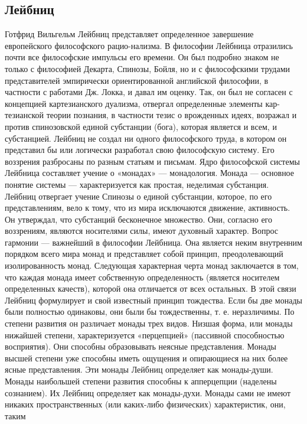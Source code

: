 \documentclass[12pt]{article}
\begin{document}
\subsection{Лейбниц}
Готфрид  Вильгельм  Лейбниц  представляет  определенное  завершение  европейского  философского  рацио-нализма. В философии Лейбница отразились почти все философские импульсы его времени. Он был подробно
знаком  не только с  философией Декарта,  Спинозы,  Бойля, но  и с  философскими трудами представителей
эмпирически ориентированной английской философии, в частности с работами Дж. Локка, и давал им оценку.
Так,  он  был  не  согласен  с  концепцией  картезианского  дуализма,  отвергал  определенные  элементы  кар-тезианской теории познания, в частности тезис о врожденных идеях, возражал и против спинозовской единой
субстанции (бога), которая является и всем, и субстанцией.
Лейбниц не создал ни одного философского труда, в котором он представил бы или логически разработал свою
философскую систему. Его воззрения разбросаны по разным статьям и письмам.
Ядро философской системы Лейбница составляет учение о «монадах» — монадология. Монада — основное
понятие системы — характеризуется как простая, неделимая субстанция. Лейбниц отвергает учение Спинозы о
единой  субстанции,  которое,  по  его  представлениям,  вело  к  тому,  что  из  мира  исключаются  движение,
активность. Он утверждал, что субстанций бесконечное множество. Они, согласно его воззрениям, являются
носителями силы, имеют духовный характер.
Вопрос гармонии — важнейший в философии Лейбница. Она является неким внутренним порядком всего мира
монад и представляет собой принцип, преодолевающий изолированность монад.
Следующая характерная черта монад заключается в том, что каждая монада имеет собственную определенность
(является носителем определенных качеств), которой она отличается от всех остальных. В этой связи Лейбниц
формулирует и свой известный принцип тождества. Если бы две монады были полностью одинаковы, они были
бы тождественны, т. е. неразличимы.
По  степени  развития  он  различает  монады  трех  видов.  Низшая  форма,  или  монады  нижайшей  степени,
характеризуется «перцепцией» (пассивной способностью восприятия). Они способны образовывать неясные
представления. Монады высшей степени уже способны иметь ощущения и опирающиеся на них более ясные
представления. Эти монады Лейбниц определяет как монады-души. Монады наибольшей степени развития
способны к апперцепции (наделены сознанием). Их Лейбниц определяет как монады-духи.
Монады сами не имеют никаких пространственных (или каких-либо физических) характеристик, они, таким
\end{document}
